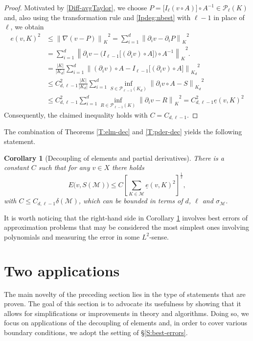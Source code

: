 \documentclass[a4paper]{amsart}
\numberwithin{equation}{section}
\theoremstyle{plain}
\newtheorem{cor}{Corollary}[section]
\theoremstyle{definition}
\begin{document}
\begin{proof}
Motivated by \eqref{Diff-avgTaylor}, we choose $P = \big[ I_{\ell} (v\circ A) 
\big] \circ A^{-1} \in{\mathcal{P}_{{\ell}}({{K}})}$ and, also using the transformation 
rule and \eqref{Ipdeg:nbest} with ${\ell}-1$ in place of ${\ell}$, 
we obtain
\begin{align*}
 e(v,{K})^2
 &\leq
 {\left\|{{\nabla} (v - P)}\right\|_{K}}^2
 =
 \sum_{i=1}^d {\left\|{\partial_i v - \partial_i P}\right\|_{K}}^2
\\
 &=
 \sum_{i=1}^d 
  {\left\|{\partial_i v - \Big(
    I_{{\ell}-1} \big[ (\partial_i v) \circ A \big] 
    \Big) \circ A^{-1}}\right\|_{K}}^2.
\\
 &=
 \frac{{\left|{K}\right|}}{{\left|{{{K}_d}}\right|}} \sum_{i=1}^d 
  {\left\|{ (\partial_i v)\circ A - I_{{\ell}-1} \big[ (\partial_i v) \circ A 
   \big] }\right\|_{{{K}_d}}}^2
\\
 &\leq
 C_{d,{\ell}-1}^2 \frac{{\left|{K}\right|}}{{\left|{{{K}_d}}\right|}} \sum_{i=1}^d
  \inf_{S\in{\mathcal{P}_{{{\ell}-1}}({{{{K}_d}}})}}
   {\left\|{\partial_i v\circ A - S}\right\|_{{{K}_d}}}^2
\\
 &\leq
 C_{d,{\ell}-1}^2  \sum_{i=1}^d
  \inf_{R\in{\mathcal{P}_{{{\ell}-1}}({{K}})}}
   {\left\|{\partial_i v - R}\right\|_{K}}^2
 =
 C_{d,{\ell}-1}^2 {\underline{e}}(v,{K})^2
\end{align*}
Consequently, the claimed inequality holds with $C=C_{d,{\ell}-1}$.
\end{proof}

The combination of Theorems \ref{T:elm-dec} and \ref{T:pder-dec} yields the 
following statement.

\begin{cor}[Decoupling of elements and partial derivatives]
\label{C:elm-pd-dec}
There is a constant $C$ such that for any $v\in X$ there holds
\[
 E\big( v,{S}({\mathcal{M}}) \big)
 \leq
 C \left[
  \sum_{{K}\in{\mathcal{M}}} {\underline{e}}(v,{K})^2
 \right]^{\frac12},
\]
with $C\leq C_{d,{\ell}-1} {\delta}({\mathcal{M}})$, which can be bounded in terms of 
$d$, ${\ell}$ and $\sigma_{\mathcal{M}}$.
\end{cor}

It is worth noticing that the right-hand side in Corollary \ref{C:elm-pd-dec} 
involves best errors of approximation problems that may be considered the most 
simplest ones involving polynomials and measuring the error in some 
${L^{2}}$-sense.

\section{Two applications}
\label{S:appl}
The main novelty of the preceding section lies in the type of statements that 
are proven.  The goal of this section is to advocate its usefulness by 
showing that it allows for simplifications or improvements in theory and 
algorithms.  Doing so, we focus on applications of the decoupling of elements 
and, in order to cover various boundary conditions, we adopt the setting of 
\S\ref{S:best-errors}.
\end{document}
